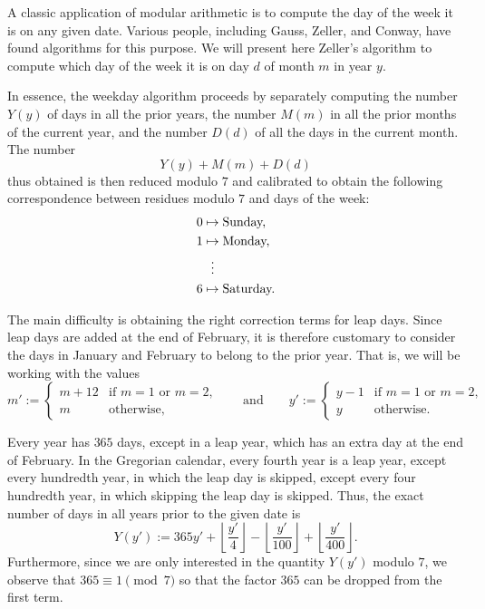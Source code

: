 \begin{example}
  A classic application of modular arithmetic is to compute the day of the week it is on any given date. Various people, including Gauss, Zeller, and Conway, have found algorithms for this purpose. We will present here Zeller's algorithm to compute which day of the week it is on day $d$ of month $m$ in year $y$.

  In essence, the weekday algorithm proceeds by separately computing the number $Y(y)$ of days in all the prior years, the number $M(m)$ in all the prior months of the current year, and the number $D(d)$ of all the days in the current month. The number
  \begin{equation*}
    Y(y)+M(m)+D(d)
  \end{equation*}
  thus obtained is then reduced modulo $7$ and calibrated to obtain the following correspondence between residues modulo $7$ and days of the week:
  \begin{align*}
    0 & \mapsto \text{Sunday,}\\
    1 & \mapsto \text{Monday,}\\
      & \mathrel{\makebox[\widthof{$\mapsto$}][c]{\vdots}}
\\
    6 & \mapsto \text{Saturday.}
  \end{align*}

  The main difficulty is obtaining the right correction terms for leap days. Since leap days are added at the end of February, it is therefore customary to consider the days in January and February to belong to the prior year. That is, we will be working with the values
  \begin{equation*}
    m' :=
    \begin{cases}
      m+12 & \text{if $m=1$ or $m=2$,} \\
      m & \text{otherwise,}
    \end{cases}
    \qquad\text{and}\qquad
    y' :=
    \begin{cases}
      y-1 & \text{if $m=1$ or $m=2$,} \\
      y & \text{otherwise.}
    \end{cases}
  \end{equation*}

  Every year has $365$ days, except in a leap year, which has an extra day at the end of February. In the Gregorian calendar, every fourth year is a leap year, except every hundredth year, in which the leap day is skipped, except every four hundredth year, in which skipping the leap day is skipped. Thus, the exact number of days in all years prior to the given date is
  \begin{equation*}
    Y(y') := 365y'+\left\lfloor\frac{y'}{4}\right\rfloor-\left\lfloor\frac{y'}{100}\right\rfloor+\left\lfloor\frac{y'}{400}\right\rfloor.
  \end{equation*}
  Furthermore, since we are only interested in the quantity $Y(y')$ modulo $7$, we observe that $365\equiv 1\pmod 7$ so that the factor $365$ can be dropped from the first term.


\end{example}
